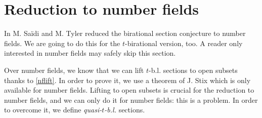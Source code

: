 \documentclass[11pt]{amsart}
\theoremstyle{plain}
\theoremstyle{definition}
\newcommand{\on}{\operatorname}
\newcommand{\1}{\mathbb{1}}
\newcommand{\mc}{\mathcal}
\newcommand{\spec}{\on{Spec}}
\begin{document}
		

\section{Reduction to number fields}

In \cite{saty21} M. Sa\"idi and M. Tyler reduced the birational section conjecture to number fields. We are going to do this for the $t$-birational version, too. A reader only interested in number fields may safely skip this section.

Over number fields, we know that we can lift $t$-b.l. sections to open subsets thanks to \autoref{nflift}. In order to prove it, we use a theorem of J. Stix \cite[Theorem B]{sti13} which is only available for number fields. Lifting to open subsets is crucial for the reduction to number fields, and we can only do it for number fields: this is a problem. In order to overcome it, we define \emph{quasi-$t$-b.l.} sections.
\end{document}
